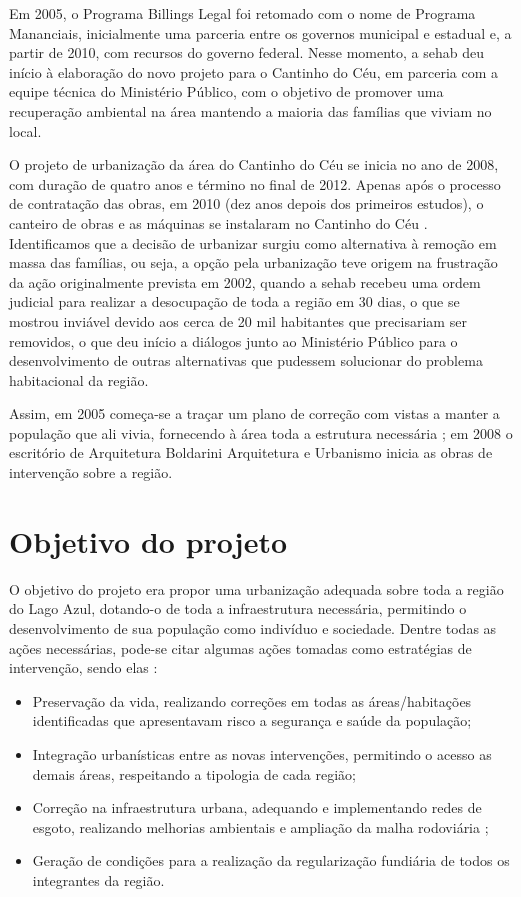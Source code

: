 	Em 2005, o Programa Billings Legal foi retomado com o nome de Programa Mananciais, inicialmente uma parceria entre os governos municipal e estadual e, a partir de 2010, com recursos do governo federal. Nesse momento, a \gls{sehab} deu início à elaboração do novo projeto para o Cantinho do Céu, em parceria com a equipe técnica do Ministério Público, com o objetivo de promover uma recuperação ambiental na área mantendo a maioria das famílias que viviam no local.
	
	O projeto de urbanização da área do Cantinho do Céu se inicia no ano de 2008, com duração de quatro anos e término no final de 2012. Apenas após o processo de contratação das obras, em 2010 (dez anos depois dos primeiros estudos), o canteiro de obras e as máquinas se instalaram no Cantinho do Céu \cite{Barda2012}. Identificamos que a decisão de urbanizar surgiu como alternativa à remoção em massa das famílias, ou seja, a opção pela urbanização teve origem na frustração da ação originalmente prevista em 2002, quando a \gls{sehab} recebeu uma ordem judicial para realizar a desocupação de toda a região em 30 dias, o que se mostrou inviável devido aos cerca de 20 mil habitantes que precisariam ser removidos, o que deu início a diálogos junto ao Ministério Público para o desenvolvimento de outras alternativas que pudessem solucionar do problema habitacional da região.
	
	Assim, em 2005 começa-se a traçar um plano de correção com vistas a manter a população que ali vivia, fornecendo à área toda a estrutura necessária \cite{Barda2012}; em 2008 o escritório de Arquitetura  Boldarini Arquitetura e Urbanismo inicia as obras de intervenção sobre a região.
	
	\section{Objetivo do projeto}
	
	O objetivo do projeto era propor uma urbanização adequada sobre toda a região do Lago Azul, dotando-o de toda a infraestrutura necessária, permitindo o desenvolvimento de sua população como indivíduo e sociedade. Dentre todas as ações necessárias, pode-se citar algumas ações tomadas como estratégias de intervenção, sendo elas \cite{Barda2012}:
	
	\begin{itemize}
	    \item Preservação da vida, realizando correções em todas as áreas/habitações identificadas que apresentavam risco a segurança e saúde da população;
	    \item Integração urbanísticas entre as novas intervenções, permitindo o acesso as demais áreas, respeitando a tipologia de cada região;
	    \item Correção na infraestrutura urbana, adequando e implementando redes de esgoto, realizando melhorias ambientais e ampliação da malha rodoviária ;
	    \item Geração de condições para a realização da regularização fundiária de todos os integrantes da região.
	\end{itemize}
	
